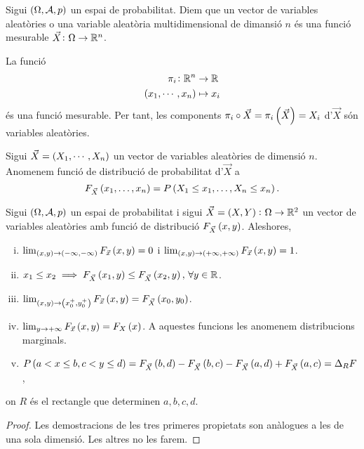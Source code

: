 \begin{defi}
    Sigui $\left(\Omega,\mathcal{A},p\right)$ un espai de probabilitat. Diem que un vector de variables aleatòries o una variable aleatòria multidimensional de dimansió $n$ és una funció mesurable $\vec{X}\colon\Omega\to\mathbb{R}^n$.
\end{defi}
\begin{obs}
    La funció 
    \begin{align*}
        \pi_i\colon\mathbb{R}^n &\to\mathbb{R}\\
        \left( x_1,\cdots,x_n\right) &\mapsto x_i
    \end{align*}
    és una funció mesurable. Per tant, les components $\pi_i\circ\vec{X}=\pi_i\left(\vec{X}\right)=X_i$ d'$\vec{X}$ són variables aleatòries.
\end{obs}
\begin{defi}
    Sigui $\vec{X}=\left( X_1,\cdots, X_n\right)$ un vector de variables aleatòries de dimensió $n$. Anomenem funció de distribució de probabilitat d'$\vec{X}$ a 
    \[
        F_{\vec{X}}\left( x_1,\dots,x_n\right) = P\left( X_1\leq x_1,\dots, X_n\leq x_n\right).
    \]
\end{defi}
\begin{prop}
    Sigui $\left(\Omega,\mathcal{A},p\right)$ un espai de probabilitat i sigui $\vec{X}=\left( X,Y\right)\colon\Omega\to\mathbb{R}^2$ un vector de variables aleatòries amb funció de distribució $F_{\vec{X}}\left( x,y\right)$. Aleshores,
    \begin{enumerate}[i)]
        \item $\lim_{\left( x,y \right)\to\left(-\infty,-\infty\right)}F_{\vec{x}}\left( x, y\right)=0$ i $\lim_{\left( x,y \right)\to\left(+\infty,+\infty\right)}F_{\vec{x}}\left( x, y\right)=1$.
        \item $x_1\leq x_2\implies F_{\vec{X}}\left( x_1,y\right)\leq F_{\vec{X}}\left( x_2,y\right),\,\forall y\in\mathbb{R}$.
        \item $\lim_{\left( x,y \right)\to\left( x_0^+,y_0^+\right)}F_{\vec{x}}\left( x, y\right)=F_{\vec{X}}\left( x_0,y_0\right)$.
        \item $\lim_{y\to+\infty}F_{\vec{x}}\left( x, y\right)=F_X\left( x\right)$. A aquestes funcions les anomenem distribucions marginals.
        \item $P\left( a<x\leq b, c<y\leq d\right)=F_{\vec{X}}\left( b,d\right)-F_{\vec{X}}\left( b,c\right)-F_{\vec{X}}\left( a,d\right)+F_{\vec{X}}\left( a,c\right)=\Delta_RF$,
    \end{enumerate}
    on $R$ és el rectangle que determinen $a, b, c, d$.
\end{prop}
\begin{proof}
    Les demostracions de les tres primeres propietats son anàlogues a les de una sola dimensió. Les altres no les farem.
\end{proof}


